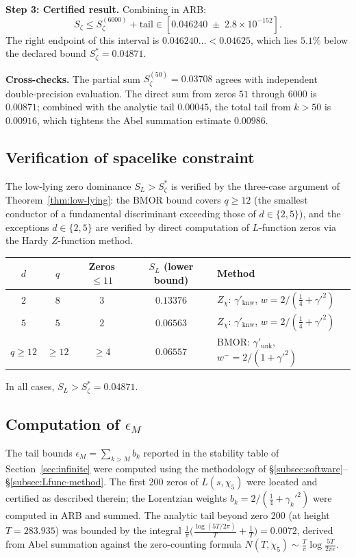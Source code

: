 \documentclass[12pt,reqno]{amsart}
\theoremstyle{plain}
\theoremstyle{definition}
\theoremstyle{remark}
\newcommand{\quarter}{\tfrac{1}{4}}
\begin{document}
\medskip\noindent\textbf{Step 3: Certified result.}
Combining in ARB:
\[
  S_\zeta \leq S_\zeta^{(6000)} + \text{tail}
  \in [0.046240 \;\pm\; 2.8\times 10^{-152}].
\]
The right endpoint of this interval is $0.046240\ldots < 0.04625$,
which lies $5.1\%$ below the declared bound $S_\zeta^* = 0.04871$.

\medskip\noindent\textbf{Cross-checks.}
The partial sum $S_\zeta^{(50)} = 0.03708$ agrees with independent
double-precision evaluation.  The direct sum from zeros $51$ through $6000$
is $0.00871$; combined with the analytic tail $0.00045$, the total tail
from $k > 50$ is $0.00916$, which tightens the Abel summation estimate $0.00986$.

\subsection{Verification of spacelike constraint}

The low-lying zero dominance $S_L > S_\zeta^*$ is verified by the three-case argument of Theorem~\ref{thm:low-lying}: the BMOR bound covers $q \geq 12$ (the smallest conductor of a fundamental discriminant exceeding those of $d \in \{2,5\}$), and the exceptions $d \in \{2, 5\}$ are verified by direct computation of $L$-function zeros via the Hardy $Z$-function method.

\begin{center}
\renewcommand{\arraystretch}{1.2}
\begin{tabular}{ccccl}
\toprule
$d$ & $q$ & Zeros $\leq 11$ & $S_L$ (lower bound) & Method \\
\midrule
$2$ & $8$ & $3$ & $0.13376$ & $Z_\chi$: $\gamma'_{\mathrm{knw}}$, $w = 2/(\quarter + \gamma'^2)$ \\
$5$ & $5$ & $2$ & $0.06563$ & $Z_\chi$: $\gamma'_{\mathrm{knw}}$, $w = 2/(\quarter + \gamma'^2)$ \\
$q \geq 12$ & $\geq 12$ & $\geq 4$ & $0.06557$ & BMOR: $\gamma'_{\mathrm{unk}}$, $w^- = 2/(1 + \gamma'^2)$ \\
\bottomrule
\end{tabular}
\end{center}
In all cases, $S_L > S_\zeta^* = 0.04871$.

\subsection{Computation of \texorpdfstring{$\epsilon_M$}{epsilon\_M}}\label{subsec:epsilon-M}

The tail bounds $\epsilon_M = \sum_{k > M} b_k$ reported in the stability table of Section~\ref{sec:infinite} were computed using the methodology of \S\ref{subsec:software}--\S\ref{subsec:Lfunc-method}.  The first 200 zeros of $L(s, \chi_5)$ were located and certified as described therein; the Lorentzian weights $b_k = 2/({\tfrac{1}{4} + {\gamma_k'}^2})$ were computed in ARB and summed.  The analytic tail beyond zero 200 (at height $T = 283.935$) was bounded by the integral $\frac{1}{\pi}\bigl(\frac{\log(5T/2\pi)}{T} + \frac{1}{T}\bigr) = 0.0072$, derived from Abel summation against the zero-counting formula $N(T, \chi_5) \sim \frac{T}{\pi}\log\frac{5T}{2\pi e}$.
\end{document}
